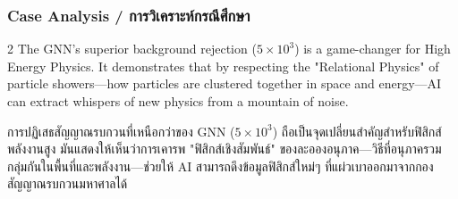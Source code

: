 \subsubsection*{Case Analysis \quad / \quad \textthai{การวิเคราะห์กรณีศึกษา}}
\begin{paracol}{2}
The GNN's superior background rejection ($5 \times 10^3$) is a game-changer for High Energy Physics. It demonstrates that by respecting the "Relational Physics" of particle showers—how particles are clustered together in space and energy—AI can extract whispers of new physics from a mountain of noise.

\switchcolumn

\begin{thai}
การปฏิเสธสัญญาณรบกวนที่เหนือกว่าของ GNN ($5 \times 10^3$) ถือเป็นจุดเปลี่ยนสำคัญสำหรับฟิสิกส์พลังงานสูง มันแสดงให้เห็นว่าการเคารพ "ฟิสิกส์เชิงสัมพันธ์" ของละอองอนุภาค—วิธีที่อนุภาครวมกลุ่มกันในพื้นที่และพลังงาน—ช่วยให้ AI สามารถดึงข้อมูลฟิสิกส์ใหม่ๆ ที่แผ่วเบาออกมาจากกองสัญญาณรบกวนมหาศาลได้
\end{thai}
\end{paracol}
